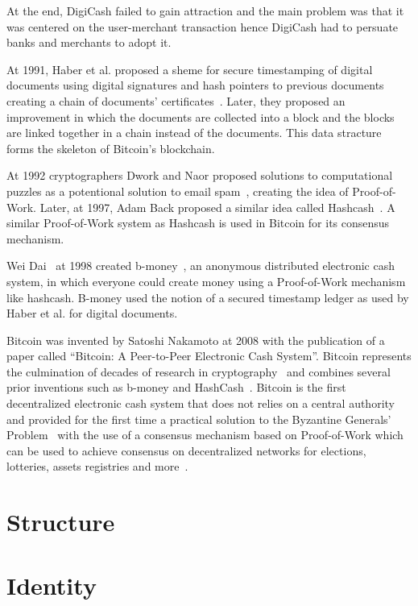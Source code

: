 At the end, DigiCash failed to gain attraction and the main problem was that it was centered on the user-merchant transaction hence
DigiCash had to persuate banks and merchants to adopt it.

At 1991, Haber et al. proposed a sheme for secure timestamping of digital documents using digital signatures and hash pointers to previous documents
creating a chain of documents' certificates~\cite{Haber1991}. Later, they proposed an improvement in which the documents are collected into a block and
the blocks are linked together in a chain instead of the documents. This data stracture forms the skeleton of Bitcoin's blockchain.

At 1992 cryptographers Dwork and Naor proposed solutions to computational puzzles as a potentional solution to email spam~\cite{Dwork1993},
creating the idea of Proof-of-Work. Later, at 1997, Adam Back proposed a similar idea called Hashcash~\cite{hash_cash}.
A similar Proof-of-Work system as Hashcash is used in Bitcoin for its consensus mechanism.

Wei Dai~\cite{bitcoin_wiki:wei_dai} at 1998 created b-money~\cite{bitcoin_wiki:b_money}, an anonymous distributed electronic cash system, in which everyone
could create money using a Proof-of-Work mechanism like hashcash. B-money used the notion of a secured timestamp ledger as used by Haber et al. for digital documents.

Bitcoin was invented by Satoshi Nakamoto at 2008 with the publication of a paper called ``Bitcoin: A Peer-to-Peer Electronic Cash System''.
Bitcoin represents the culmination of decades of research in cryptography~\cite{antonopoulos2014mastering} and combines several prior inventions
such as b-money and HashCash~\cite{antonopoulos2014mastering}. Bitcoin is the first decentralized electronic cash system that does not relies on a central authority and
provided for the first time a practical solution to the Byzantine Generals' Problem~\cite{wiki:byzantine_fault_tolerance} with the use of a consensus mechanism
based on Proof-of-Work which can be used to achieve consensus on decentralized networks for elections, lotteries, assets registries and more~\cite{antonopoulos2014mastering}.

\section{Structure}\label{blockchain:structure}

\section{Identity}\label{blockchain:identity}

